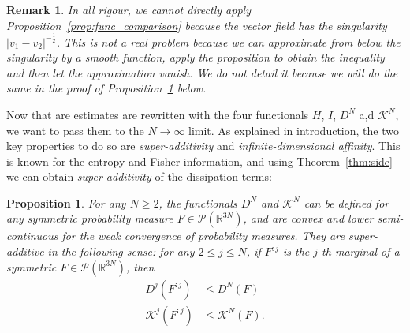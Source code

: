 \documentclass[11pt,a4paper]{article}
\theoremstyle{definition}
\theoremstyle{plain}
\newtheorem{prop}[defi]{Proposition}
\newtheorem{remark}[defi]{Remark}
\begin{document}
\begin{remark}
    In all rigour, we cannot directly apply Proposition~\ref{prop:func_comparison} because the vector field has the singularity $\vert v_1-v_2\vert^{-\frac{1}{2}}$. This is not a real problem because we can approximate from below the singularity by a smooth function, apply the proposition to obtain the inequality and then let the approximation vanish. We do not detail it because we will do the same in the proof of Proposition~\ref{prop:convexlscsuperadditve} below.
\end{remark}
Now that are estimates are rewritten with the four functionals $H$, $I$, $D^N$ a,d $\mathcal{K}^N$, we want to pass them to the $N\rightarrow \infty$ limit. As explained in introduction, the two key properties to do so are \textit{super-additivity} and \textit{infinite-dimensional affinity}. This is known for the entropy and Fisher information, and using Theorem~\ref{thm:side} we can obtain \textit{super-additivity} of the dissipation terms:
\begin{prop}
\label{prop:convexlscsuperadditve}
    For any $N\geq 2$, the functionals $D^N$ and $\mathcal{K}^N$ can be defined for any symmetric probability measure $F\in\mathcal{P}(\mathbb{R}^{3N})$, and are convex and lower semi-continuous for the weak convergence of probability measures. They are super-additive in the following sense: for any $2\leq j \leq N$, if $F^{:j}$ is the $j$-th marginal of a symmetric $F\in \mathcal{P}(\mathbb{R}^{3N})$, then
    \begin{align*}
        D^{j}(F^{:j}) &\leq D^{N}(F)\\
        \mathcal{K}^{j}(F^{:j}) &\leq \mathcal{K}^{N}(F).
    \end{align*}
\end{prop}
\end{document}
